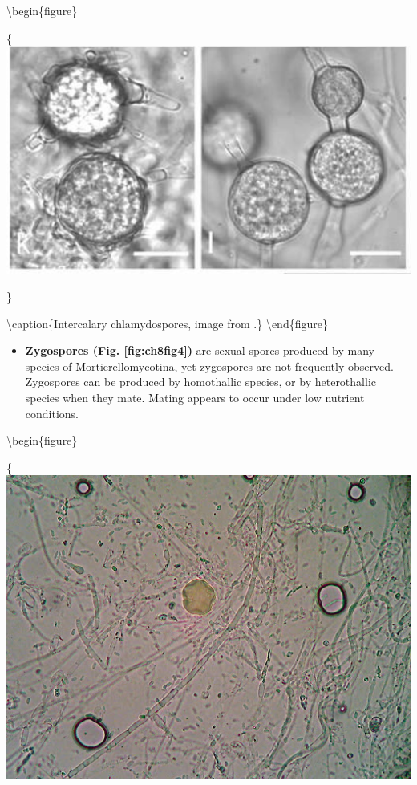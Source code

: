 \documentclass[]{book}
\providecommand{\tightlist}{%
  \setlength{\itemsep}{0pt}\setlength{\parskip}{0pt}}
\begin{document}
\textbackslash begin\{figure\}

\{\centering \includegraphics[width=12.11in]{img/Ch8_Fig3}

\}

\textbackslash caption\{Intercalary chlamydospores, image from \citet{Wagner_2013}.\}\label{fig:ch8fig3}
\textbackslash end\{figure\}

\begin{itemize}
\tightlist
\item
  \textbf{Zygospores (Fig. \ref{fig:ch8fig4}) } are sexual spores produced by many species of Mortierellomycotina, yet zygospores are not frequently observed. Zygospores can be produced by homothallic species, or by heterothallic species when they mate. Mating appears to occur under low nutrient conditions.
\end{itemize}

\textbackslash begin\{figure\}

\{\centering \includegraphics{img/Ch8_Fig4}
\end{document}
